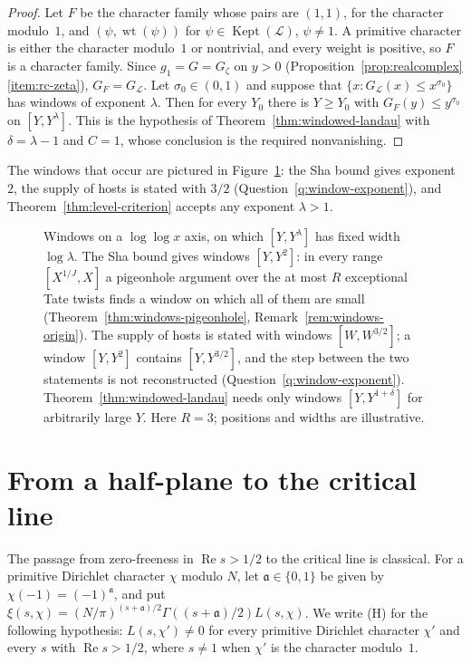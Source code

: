 \documentclass[11pt]{amsbook}
\theoremstyle{plain}
\theoremstyle{definition}
\theoremstyle{remark}
\numberwithin{equation}{section}
\numberwithin{figure}{chapter}
\numberwithin{table}{chapter}
\newcommand{\lev}{\mathscr{L}}
\newcommand{\Gz}{G_{\zeta}}
\newcommand{\Kept}{\operatorname{Kept}}
\newcommand{\wt}{\operatorname{wt}}
\begin{document}
\begin{proof}
Let $F$ be the character family whose pairs are $(1,1)$, for the
character modulo~$1$, and $(\psi,\wt(\psi))$ for
$\psi\in\Kept(\lev)$, $\psi\ne1$. A primitive character is either the
character modulo~$1$ or nontrivial, and every weight is positive, so
$F$ is a character family. Since $g_1=G=\Gz$ on $y>0$
(Proposition~\ref{prop:realcomplex}\ref{item:rc-zeta}), $G_F=G_{\lev}$. Let
$\sigma_0\in(0,1)$ and suppose that $\{x:G_{\lev}(x)\le x^{\sigma_0}\}$
has windows of exponent $\lambda$. Then for every $Y_0$ there is
$Y\ge Y_0$ with $G_F(y)\le y^{\sigma_0}$ on $[Y,Y^\lambda]$. This is
the hypothesis of Theorem~\ref{thm:windowed-landau} with
$\delta=\lambda-1$ and $C=1$, whose conclusion is the required
nonvanishing.
\end{proof}

The windows that occur are pictured in Figure~\ref{fig:windows}: the
Sha bound gives exponent $2$, the supply of hosts is stated with
$3/2$ (Question~\ref{q:window-exponent}), and
Theorem~\ref{thm:level-criterion} accepts any exponent $\lambda>1$.

\begin{figure}[htbp]
\centering

\caption{Windows on a $\log\log x$ axis, on which $[Y,Y^\lambda]$ has
fixed width $\log\lambda$. The Sha bound gives windows $[Y,Y^2]$: in
every range $[X^{1/J},X]$ a pigeonhole argument over the at most $R$
exceptional Tate twists finds a window on which all of them are small
(Theorem~\ref{thm:windows-pigeonhole},
Remark~\ref{rem:windows-origin}). The supply of hosts is stated
with windows $[W,W^{3/2}]$; a window $[Y,Y^2]$ contains
$[Y,Y^{3/2}]$, and the step between the two statements is not
reconstructed (Question~\ref{q:window-exponent}).
Theorem~\ref{thm:windowed-landau} needs only windows
$[Y,Y^{1+\delta}]$ for arbitrarily large $Y$. Here $R=3$; positions
and widths are illustrative.}
\label{fig:windows}
\end{figure}

\section{From a half-plane to the critical line}

The passage from zero-freeness in $\operatorname{Re}s>1/2$ to the
critical line is classical. For a primitive Dirichlet character $\chi$
modulo $N$, let $\mathfrak a\in\{0,1\}$ be given by
$\chi(-1)=(-1)^{\mathfrak a}$, and put
$\xi(s,\chi)=(N/\pi)^{(s+\mathfrak a)/2}\Gamma((s+\mathfrak a)/2)
L(s,\chi)$.
We write (H) for the following hypothesis: $L(s,\chi')\ne0$ for every
primitive Dirichlet character $\chi'$ and every $s$ with
$\operatorname{Re}s>1/2$, where $s\ne1$ when $\chi'$ is the character
modulo~$1$.
\end{document}
